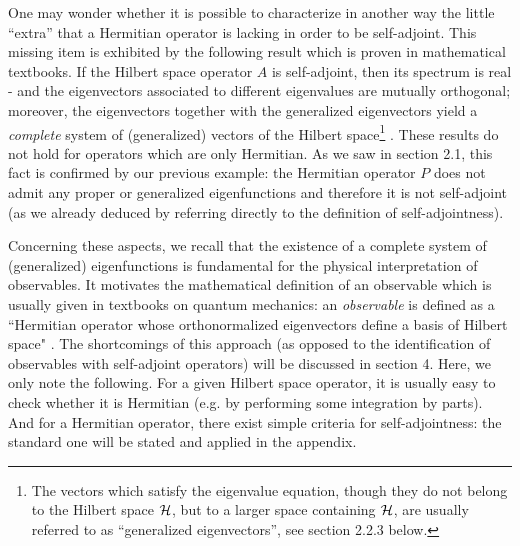 \documentclass[a4wide,12pt]{report}
\begin{document}
One may wonder whether it is possible to characterize in another 
way the little ``extra'' that a 
Hermitian operator is lacking in order to  
be self-adjoint. This missing item 
is exhibited by the following
result which is proven in mathematical textbooks. 
If the Hilbert space operator $A$ is self-adjoint, then  
its spectrum is real \cite{ri,sg}\cite{af}-\cite{krey} and 
the eigenvectors associated to different eigenvalues 
are mutually orthogonal; moreover, the eigenvectors together 
with the generalized eigenvectors
 yield a {\em complete} 
system of (generalized) vectors of the Hilbert space\footnote{The 
vectors which satisfy the eigenvalue equation, though they 
do not belong to the Hilbert space ${\cal H}$, but to a larger space 
containing ${\cal H}$, are usually referred to as 
``generalized eigenvectors'', 
see section 2.2.3 below.} 
\cite{gv,bere,sg}.
These results do not hold for operators which are 
only Hermitian. 
As we saw in section 2.1, 
this fact is confirmed by our previous example:
the Hermitian operator $P$ does not admit any 
proper or generalized eigenfunctions 
and therefore it is not self-adjoint (as we already 
deduced by referring directly to the 
 definition of self-adjointness).  

Concerning these aspects, we recall 
that the existence of a complete 
 system of (generalized)
eigenfunctions is fundamental 
 for the physical interpretation of 
observables. It motivates the mathematical definition of an observable 
which is usually given in textbooks on 
quantum mechanics: an  
{\em observable} is defined as a ``Hermitian operator 
whose orthonormalized eigenvectors define a basis of Hilbert 
space" \cite{ct}. 
The shortcomings of this approach (as opposed to 
the identification of observables with self-adjoint operators)
will be discussed in section 4. Here, we only note 
the following. 
For a given Hilbert space operator, it is usually 
 easy to check whether it is Hermitian (e.g. by performing
 some integration by parts). 
And for a Hermitian operator, 
there exist 
simple criteria for self-adjointness: the 
standard one will be 
stated and applied in the appendix. 
\end{document}
